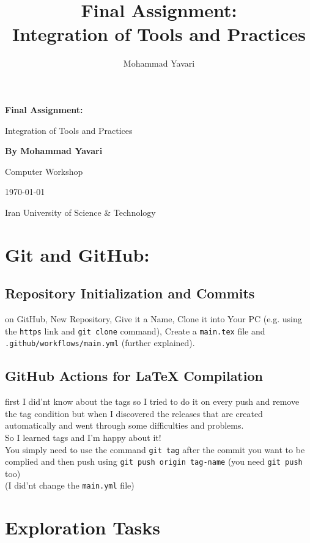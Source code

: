 \documentclass[titlepage]{article}
\title{Final Assignment:\\Integration of Tools and Practices}
\author{Mohammad Yavari}
\renewcommand{\maketitle}{
	\begin{titlepage}
		\centering
		
		{\Huge\bfseries Final Assignment:} \par
		\vspace{0.5cm}
		
		{\Large Integration of Tools and Practices} \par
		\vspace{1.5cm}
		
		
		\textbf{By Mohammad Yavari}
	
		
		\vfill
		
		{\large Computer Workshop} \par
		
		\vspace{1cm}
		
		{\large \today} \par
		
		\vspace{1cm}
		
		{\large Iran University of Science \& Technology} \par
	\end{titlepage}
}
\begin{document}
\maketitle
\tableofcontents
\pagebreak
\section{Git and GitHub:}
\subsection{Repository Initialization and Commits}
on GitHub, New Repository, Give it a Name, Clone it into Your PC (e.g. using the \texttt{https} link and \texttt{git clone} command), Create a \texttt{main.tex} file and \texttt{.github/workflows/main.yml} (further explained).
\subsection{ GitHub Actions for LaTeX Compilation}
first I did'nt know about the tags so I tried to do it on every push and remove the tag condition but when I discovered the releases that are created automatically and went through some difficulties and problems.\\
So I learned tags and I'm happy about it!\\
You simply need to use the command \texttt{git tag} after the commit you want to be complied and then push using \texttt{git push origin tag-name} (you need \texttt{git push} too)\\
(I did'nt change the \texttt{main.yml} file) 
\section{Exploration Tasks}
\end{document}
